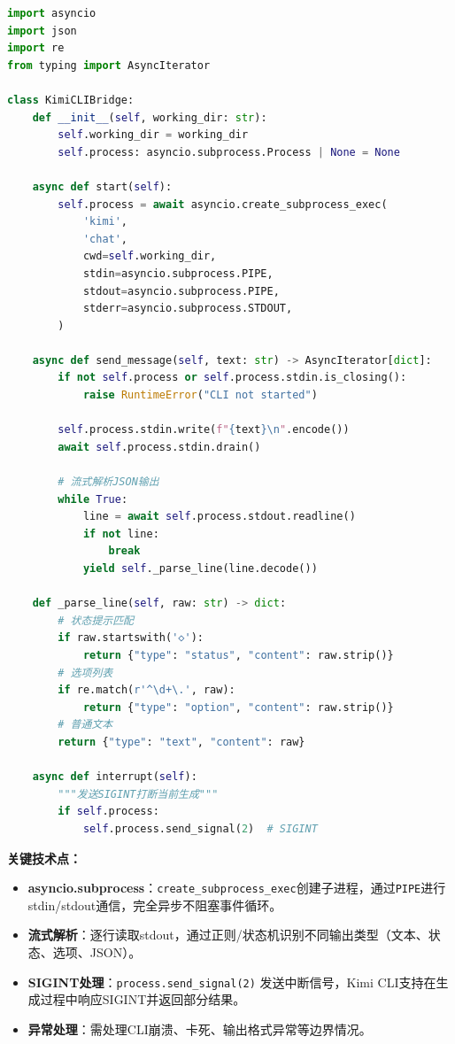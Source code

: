 \documentclass[fontset=mac,a4paper,11pt]{ctexart}
\begin{document}
\begin{lstlisting}[language=Python, caption=CLI桥接核心逻辑]
import asyncio
import json
import re
from typing import AsyncIterator

class KimiCLIBridge:
    def __init__(self, working_dir: str):
        self.working_dir = working_dir
        self.process: asyncio.subprocess.Process | None = None

    async def start(self):
        self.process = await asyncio.create_subprocess_exec(
            'kimi',
            'chat',
            cwd=self.working_dir,
            stdin=asyncio.subprocess.PIPE,
            stdout=asyncio.subprocess.PIPE,
            stderr=asyncio.subprocess.STDOUT,
        )

    async def send_message(self, text: str) -> AsyncIterator[dict]:
        if not self.process or self.process.stdin.is_closing():
            raise RuntimeError("CLI not started")

        self.process.stdin.write(f"{text}\n".encode())
        await self.process.stdin.drain()

        # 流式解析JSON输出
        while True:
            line = await self.process.stdout.readline()
            if not line:
                break
            yield self._parse_line(line.decode())

    def _parse_line(self, raw: str) -> dict:
        # 状态提示匹配
        if raw.startswith('◇'):
            return {"type": "status", "content": raw.strip()}
        # 选项列表
        if re.match(r'^\d+\.', raw):
            return {"type": "option", "content": raw.strip()}
        # 普通文本
        return {"type": "text", "content": raw}

    async def interrupt(self):
        """发送SIGINT打断当前生成"""
        if self.process:
            self.process.send_signal(2)  # SIGINT
\end{lstlisting}

\textbf{关键技术点：}
\begin{itemize}[leftmargin=2em]
\item \textbf{asyncio.subprocess}：\texttt{create\_subprocess\_exec}创建子进程，通过\texttt{PIPE}进行stdin/stdout通信，完全异步不阻塞事件循环。
\item \textbf{流式解析}：逐行读取stdout，通过正则/状态机识别不同输出类型（文本、状态、选项、JSON）。
\item \textbf{SIGINT处理}：\texttt{process.send\_signal(2)} 发送中断信号，Kimi CLI支持在生成过程中响应SIGINT并返回部分结果。
\item \textbf{异常处理}：需处理CLI崩溃、卡死、输出格式异常等边界情况。
\end{itemize}
\end{document}
